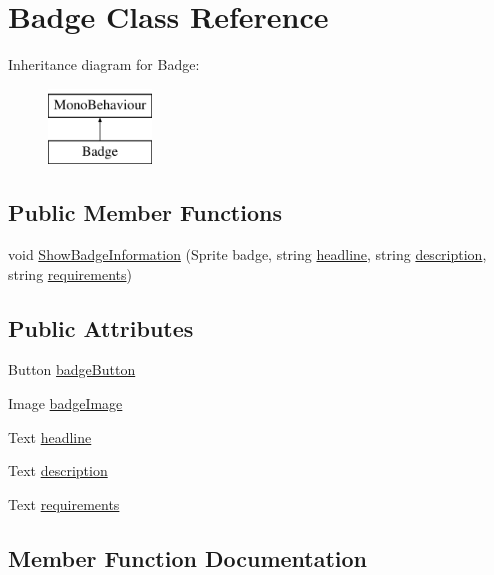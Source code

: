 \hypertarget{classBadge}{}\section{Badge Class Reference}
\label{classBadge}
Inheritance diagram for Badge\+:\begin{figure}[H]
\begin{center}
\leavevmode
\includegraphics[height=2.000000cm]{classBadge}
\end{center}
\end{figure}
\subsection*{Public Member Functions}
\begin{DoxyCompactItemize}
\item 
void \hyperlink{classBadge_ad08486d9079acca84576b8c51fc5b170}{Show\+Badge\+Information} (Sprite badge, string \hyperlink{classBadge_af8bd5a9e7c02e0104e6de94a66ccdfd6}{headline}, string \hyperlink{classBadge_aab7be8507723554627a10cb9adbc850c}{description}, string \hyperlink{classBadge_a2f25bf37b462f6420daf0e140007f824}{requirements})
\end{DoxyCompactItemize}
\subsection*{Public Attributes}
\begin{DoxyCompactItemize}
\item 
Button \hyperlink{classBadge_ace9d1cd33c62176b99d96b2254ce3d8d}{badge\+Button}
\item 
Image \hyperlink{classBadge_a46b3327e11f63abf7adb1236a123369c}{badge\+Image}
\item 
Text \hyperlink{classBadge_af8bd5a9e7c02e0104e6de94a66ccdfd6}{headline}
\item 
Text \hyperlink{classBadge_aab7be8507723554627a10cb9adbc850c}{description}
\item 
Text \hyperlink{classBadge_a2f25bf37b462f6420daf0e140007f824}{requirements}
\end{DoxyCompactItemize}


\subsection{Member Function Documentation}
\mbox{\label{classBadge_ad08486d9079acca84576b8c51fc5b170}} 
